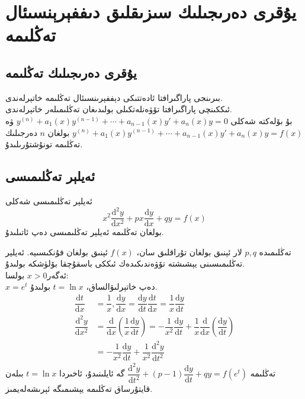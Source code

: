 \section{يۇقرى دەرىجىلىك سىزىقلىق دىففېرېنسىئال تەڭلىمە}
\subsection{يۇقرى دەرىجىلىك تەڭلىمە}
بىرىنجى پاراگىرافتا ئادەتتىكى دېففېرىنسىئال تەڭلىمە خاتېرلەندى.\\
ئىككىنچى پاراگىرافتا تۆۋەنلەتكىلى بولىدىغان تەڭلىمىلەر خاتېرلەندى.\\
بۇ بۆلەكتە شەكلى
$y^{(n)}+a_1(x)y^{(n-1)}+\cdots+a_{n-1}(x)y'+a_n(x)y=0$
ۋە
$y^{(n)}+a_1(x)y^{(n-1)}+\cdots+a_{n-1}(x)y'+a_n(x)y=f(x)$
بولغان $n$ دەرجىلىك تەڭلىمە تونۇشتۇرىلىدۇ.

\subsection{ئەيلېر تەڭلىمىسى}

\begin{MyDefinition}{ئەيلېر تەڭلىمىسى}{}
شەكلى
$$x^2\dfrac{\textrm{d}^2y}{\textrm{d}x^2}+px\dfrac{\textrm{d}y}{\textrm{d}x}+qy=f(x)$$
بولغان تەڭلىمە ئەيلېر تەڭلىمىسى دەپ ئاتىلىدۇ.
\end{MyDefinition}
تەڭلىمىدە $p,q$ لار ئېنىق بولغان تۇراقلىق سان، $f(x)$ ئېنىق بولغان فۇنكىسىيە.
ئەيلېر تەڭلىمىسىنى يېشىشتە تۆۋەندىكىدەك ئىككى باسقۇچقا بۆلۈشكە بولىدۇ.\\
ئەگەر$x>0$ بولسا:\\
$x=e^t$
دەپ خاتېرلىۋالساق،
$t=\ln x$
بولىدۇ.
\begin{align*}
\dfrac{\textrm{d}t}{\textrm{d}x}
&=\dfrac{1}{x},\dfrac{\textrm{d}y}{\textrm{d}x}=\dfrac{\textrm{d}y}{\textrm{d}t}\dfrac{\textrm{d}t}{\textrm{d}x}=\dfrac{1}{x}\dfrac{\textrm{d}y}{\textrm{d}t}
\\
\dfrac{\textrm{d}^2y}{\textrm{d}x^2}
&=\dfrac{\textrm{d}}{\textrm{d}x}\left(\dfrac{1}{x}\dfrac{\textrm{d}y}{\textrm{d}t}\right)
=-\dfrac{1}{x^2}\dfrac{\textrm{d}y}{\textrm{d}t}+\dfrac{1}{x}\dfrac{\textrm{d}}{\textrm{d}x}\left(\dfrac{\textrm{d}y}{\textrm{d}t}\right)\\
&=-\dfrac{1}{x^2}\dfrac{\textrm{d}y}{\textrm{d}t}+\dfrac{1}{x^2}\dfrac{\textrm{d}^2y}{\textrm{d}t^2}
\end{align*}
تەڭلىمە
$\dfrac{\textrm{d}^2y}{\textrm{d}t^2}+(p-1)\dfrac{\textrm{d}y}{\textrm{d}t}+qy=f(e^t)$
گە ئايلىنىدۇ، ئاخىردا
$t=\ln x$
بىلەن قايتۇرساق تەڭلىمە يېشىمىگە ئېرىشەلەيمىز.\\

